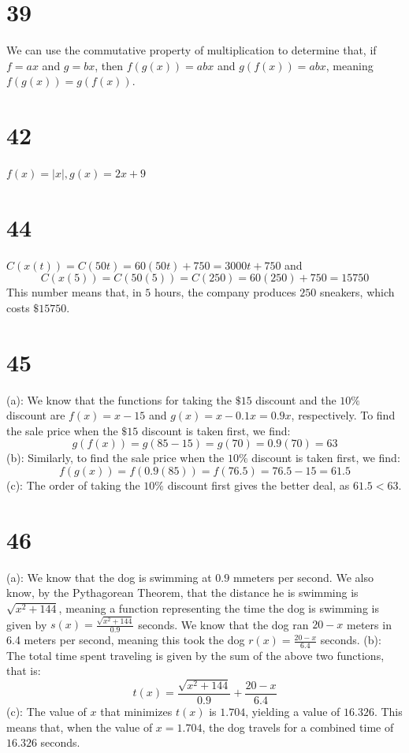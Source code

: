 \documentclass{article}
\theoremstyle{definition}
\begin{document}
\section*{39}
We can use the commutative property of multiplication to determine that, if $f=ax$ and $g=bx$, then $f(g(x))=abx$ and $g(f(x))=abx$, 
meaning $f(g(x))=g(f(x))$.

\section*{42}
$f(x)=|x|,g(x)=2x+9$

\section*{44}
$C(x(t))=C(50t)=60(50t)+750=3000t+750$ and \[ C(x(5))=C(50(5))=C(250)=60(250)+750=15750 \]
This number means that, in $5$ hours, the company produces $250$ sneakers, which costs $\$15750$.

\section*{45}
(a): We know that the functions for taking the $\$15$ discount and the $10\%$ discount are $f(x)=x-15$ and $g(x)=x-0.1x=0.9x$, respectively. To find the 
sale price when the $\$15$ discount is taken first, we find:
\[ g(f(x))=g(85-15)=g(70)=0.9(70)=63 \]
(b): Similarly, to find the sale price when the $10\%$ discount is taken first, we find:
\[ f(g(x))=f(0.9(85))=f(76.5)=76.5-15=61.5 \]
(c): The order of taking the $10\%$ discount first gives the better deal, as $61.5<63$.

\section*{46}
(a): We know that the dog is swimming at $0.9$ mmeters per second. We also know, by the Pythagorean Theorem, that the distance he is swimming is 
$\sqrt{x^2+144}$, meaning a function representing the time the dog is swimming is given by $s(x)=\frac{\sqrt{x^2+144}}{0.9}$ seconds. 
We know that the dog ran $20-x$ meters in 6.4 meters per second, meaning this took the dog $r(x)=\frac{20-x}{6.4}$ seconds.\newline
(b): The total time spent traveling is given by the sum of the above two functions, that is:
\[ t(x)=\frac{\sqrt{x^2+144}}{0.9}+\frac{20-x}{6.4} \]
(c): The value of $x$ that minimizes $t(x)$ is $1.704$, yielding a value of $16.326$. This means that, when the value of $x=1.704$, the dog travels for a 
combined time of $16.326$ seconds.
\end{document}
